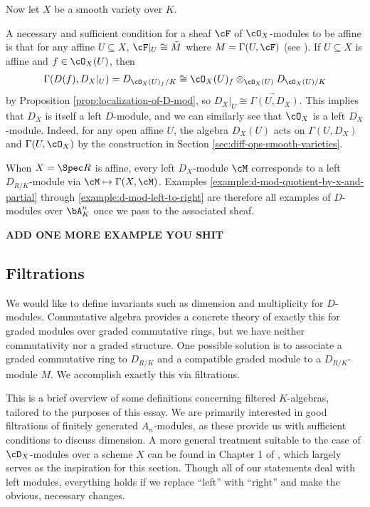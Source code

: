 Now let $X$ be a smooth variety over $K$.

\begin{example}\label{example:d-mod-variety-trivial}
	A necessary and sufficient condition for a sheaf $\cF$ of $\cO_X$-modules to be affine is that for any affine $U\subseteq X$, $\cF|_U \cong \tilde{M}$ where $M = \Gamma(U,\cF)$ (see \cite[Chapter 2.5]{hartshorne}). If $U\subseteq X$ is affine and $f \in \cO_X(U)$, then 
	\begin{align*}
		\Gamma(D(f),D_X|_U) = D_{\cO_X(U)_f/K} \cong \cO_X(U)_f \otimes_{\cO_X(U)} D_{\cO_X(U)/K}
	\end{align*}
	by Proposition \ref{prop:localization-of-D-mod}, so $D_X|_U \cong \widetilde{\Gamma(U,D_X)}$. This implies that $D_X$ is itself a left $D$-module, and we can similarly see that $\cO_X$ is a left $D_X$-module. Indeed, for any open affine $U$, the algebra $D_X(U)$ acts on $\Gamma(U,D_X)$ and $\Gamma(U,\cO_X)$ by the construction in Section \ref{sec:diff-ops-smooth-varieties}.
\end{example}
\begin{example}\label{example:d-mod-affine}
	When $X = \Spec R$ is affine, every left $D_X$-module $\cM$ corresponds to a left $D_{R/K}$-module via $\cM \mapsto \Gamma(X,\cM)$. Examples \ref{example:d-mod-quotient-by-x-and-partial} through \ref{example:d-mod-left-to-right} are therefore all examples of $D$-modules over $\bA^n_K$ once we pass to the associated sheaf.
\end{example}

\textbf{ADD ONE MORE EXAMPLE YOU SHIT}

\subsection{Filtrations}

We would like to define invariants such as dimension and multiplicity for $D$-modules. Commutative algebra provides a concrete theory of exactly this for graded modules over graded commutative rings, but we have neither commutativity nor a graded structure. One possible solution is to associate a graded commutative ring to $D_{R/K}$ and a compatible graded module to a $D_{R/K}$-module $M$. We accomplish exactly this via filtrations. 

This is a brief overview of some definitions concerning filtered $K$-algebras, tailored to the purposes of this essay. We are primarily interested in good filtrations of finitely generated $A_n$-modules, as these provide us with sufficient conditions to discuss dimension. A more general treatment suitable to the case of $\cD_X$-modules over a scheme $X$ can be found in Chapter 1 of \cite{ginzburg_d-mod}, which largely serves as the inspiration for this section. Though all of our statements deal with left modules, everything holds if we replace ``left'' with ``right'' and make the obvious, necessary changes.

